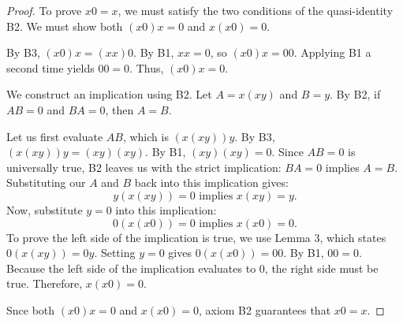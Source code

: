 \documentclass[10pt,a4paper]{amsart}
\begin{document}
\begin{proof}
To prove $x0 = x$, we must satisfy the two conditions of the quasi-identity B2. We must show both $(x0)x = 0$ and $x(x0) = 0$.

\vspace{0.5em}
\noindent 
By B3, $(x0)x = (xx)0$. By B1, $xx = 0$, so $(x0)x = 00$. Applying B1 a second time yields $00 = 0$. Thus, $(x0)x = 0$.

\vspace{0.5em}
\noindent 
We construct an implication using B2. Let $A = x(xy)$ and $B = y$. By B2, if $AB = 0$ and $BA = 0$, then $A = B$.

\vspace{0.5em}
\noindent 
Let us first evaluate $AB$, which is $(x(xy))y$. By B3, $(x(xy))y = (xy)(xy)$. By B1, $(xy)(xy) = 0$. Since $AB = 0$ is universally true, B2 leaves us with the strict implication: $BA = 0$ implies $A = B$. Substituting our $A$ and $B$ back into this implication gives:
\[ y(x(xy)) = 0 \text{ implies } x(xy) = y. \]
Now, substitute $y = 0$ into this implication:
\[ 0(x(x0)) = 0 \text{ implies } x(x0) = 0. \]
To prove the left side of the implication is true, we use Lemma 3, which states $0(x(xy)) = 0y$. Setting $y = 0$ gives $0(x(x0)) = 00$. By B1, $00 = 0$. Because the left side of the implication evaluates to $0$, the right side must be true. Therefore, $x(x0) = 0$.

\vspace{0.5em}
\noindent Snce both $(x0)x = 0$ and $x(x0) = 0$, axiom B2 guarantees that $x0 = x$.
\end{proof}
\end{document}
